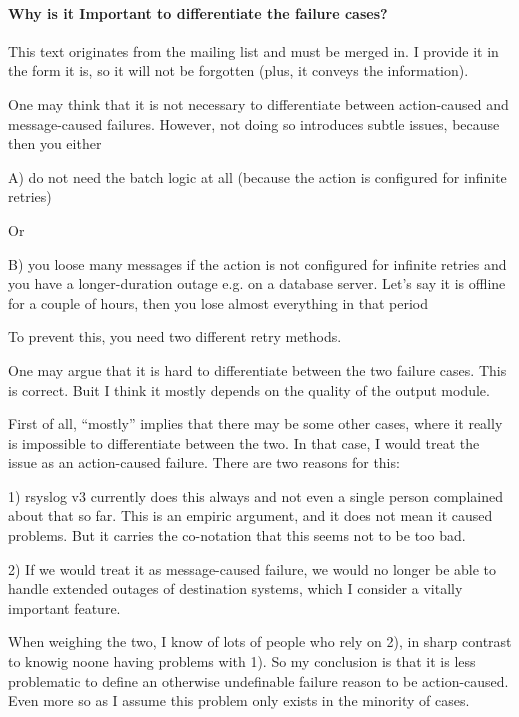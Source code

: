 \documentclass[a4paper,10pt]{article}
\begin{document}
\paragraph{Why is it Important to differentiate the failure cases?}
This text originates from the mailing list and must be merged in. I provide it in the form it is, so it will not be forgotten (plus, it conveys the information).

One may think that it is not necessary to differentiate between action-caused and message-caused failures. However, not doing so introduces subtle issues, because 
then you either 

A) do not need the batch logic at all (because the action is configured for
infinite retries)

Or

B) you loose many messages if the action is not configured for infinite
retries and you have a longer-duration outage e.g. on a database server.
Let's say it is offline for a couple of hours, then you lose almost
everything in that period

To prevent this, you need two different retry methods.

One may argue that it is hard to differentiate between the two failure cases. This is correct. Buit I think it mostly depends on the quality of the output module. 

First of all, ``mostly'' implies that there may be some other cases, where it
really is impossible to differentiate between the two. In that case, I would
treat the issue as an action-caused failure. There are two reasons for this:

1) rsyslog v3 currently does this always and not even a single person
complained about that so far. This is an empiric argument, and it does not
mean it caused problems. But it carries the co-notation that this seems not
to be too bad.

2) If we would treat it as message-caused failure, we would no longer be able
to handle extended outages of destination systems, which I consider a vitally
important feature.

When weighing the two, I know of lots of people who rely on 2), in sharp
contrast to knowig noone having problems with 1). So my conclusion is that it is
less problematic to define an otherwise undefinable failure reason to be
action-caused. Even more so as I assume this problem only exists in the
minority of cases.
\end{document}
